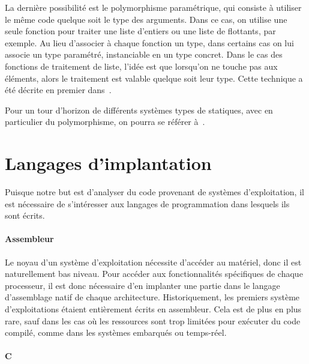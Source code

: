 La dernière possibilité est le polymorphisme paramétrique, qui consiste à
utiliser le même code quelque soit le type des arguments. Dans ce cas, on
utilise une seule fonction pour traiter une liste d'entiers ou une liste de
flottants, par exemple. Au lieu d'associer à chaque fonction un type, dans
certains cas on lui associe un type paramétré, instanciable en un type concret.
Dans le cas des fonctions de traitement de liste, l'idée est que lorsqu'on ne
touche pas aux éléments, alors le traitement est valable quelque soit leur type.
Cette technique a été décrite en premier dans~\cite{Milner78}.

Pour un tour d'horizon de différents systèmes types de statiques, avec en
particulier du polymorphisme, on pourra se référer à~\cite{TAPL}.

\section{Langages d'implantation}

Puisque notre but est d'analyser du code provenant de systèmes d'exploitation,
il est nécessaire de s'intéresser aux langages de programmation dans lesquels
ils sont écrits.

\paragraph{Assembleur}

Le noyau d'un système d'exploitation nécessite d'accéder au matériel, donc il
est naturellement bas niveau. Pour accéder aux fonctionnalités spécifiques de
chaque processeur, il est donc nécessaire d'en implanter une partie dans le
langage d'assemblage natif de chaque architecture. Historiquement, les premiers
système d'exploitations étaient entièrement écrits en assembleur. Cela est de
plus en plus rare, sauf dans les cas où les ressources sont trop limitées pour
exécuter du code compilé, comme dans les systèmes embarqués ou temps-réel.

\paragraph{C}

